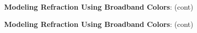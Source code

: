 \documentclass[DM,toc]{lsstdoc}
\begin{document}
\begin{figure}
    \ContinuedFloat
    \centering
    \caption[]{{\bf Modeling Refraction Using Broadband Colors}: (cont)}
    \label{rmodel2}
\end{figure}
\begin{figure}
    \ContinuedFloat
    \centering
    \caption[]{{\bf Modeling Refraction Using Broadband Colors}: (cont)}
    \label{rmodel2}
\end{figure}
\clearpage
\end{document}
